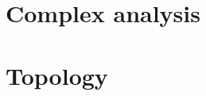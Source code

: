 \documentclass[oneside]{book}
\begin{document}
\part{Complex analysis}



\part{Topology}










\end{document}
